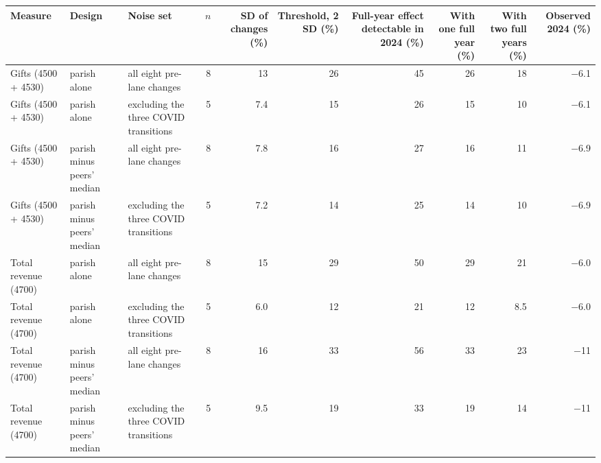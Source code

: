 \begin{tabular}{@{}lllrrrrrrr@{}}\toprule
Measure & Design & Noise set & $n$ & SD of changes (\%) & Threshold, 2 SD (\%) & Full-year effect detectable in 2024 (\%) & With one full year (\%) & With two full years (\%) & Observed 2024 (\%) \\\midrule
Gifts (4500 + 4530) & parish alone & all eight pre-lane changes & 8 & 13 & 26 & 45 & 26 & 18 & $-$6.1 \\
Gifts (4500 + 4530) & parish alone & excluding the three COVID transitions & 5 & 7.4 & 15 & 26 & 15 & 10 & $-$6.1 \\
Gifts (4500 + 4530) & parish minus peers' median & all eight pre-lane changes & 8 & 7.8 & 16 & 27 & 16 & 11 & $-$6.9 \\
Gifts (4500 + 4530) & parish minus peers' median & excluding the three COVID transitions & 5 & 7.2 & 14 & 25 & 14 & 10 & $-$6.9 \\
Total revenue (4700) & parish alone & all eight pre-lane changes & 8 & 15 & 29 & 50 & 29 & 21 & $-$6.0 \\
Total revenue (4700) & parish alone & excluding the three COVID transitions & 5 & 6.0 & 12 & 21 & 12 & 8.5 & $-$6.0 \\
Total revenue (4700) & parish minus peers' median & all eight pre-lane changes & 8 & 16 & 33 & 56 & 33 & 23 & $-$11 \\
Total revenue (4700) & parish minus peers' median & excluding the three COVID transitions & 5 & 9.5 & 19 & 33 & 19 & 14 & $-$11 \\
\bottomrule\end{tabular}
